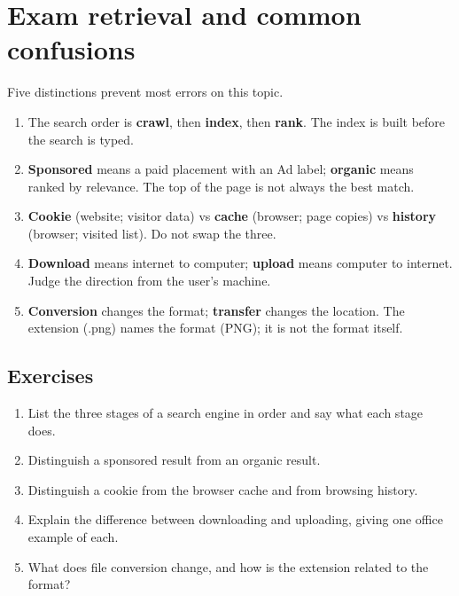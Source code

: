 \section{Exam retrieval and common confusions}
Five distinctions prevent most errors on this topic.
\begin{enumerate}
  \item The search order is \textbf{crawl}, then \textbf{index}, then
    \textbf{rank}. The index is built before the search is typed.
  \item \textbf{Sponsored} means a paid placement with an Ad label;
    \textbf{organic} means ranked by relevance. The top of the page is not
    always the best match.
  \item \textbf{Cookie} (website; visitor data) vs \textbf{cache} (browser;
    page copies) vs \textbf{history} (browser; visited list). Do not swap
    the three.
  \item \textbf{Download} means internet to computer; \textbf{upload} means
    computer to internet. Judge the direction from the user's machine.
  \item \textbf{Conversion} changes the format; \textbf{transfer} changes
    the location. The extension (.png) names the format (PNG); it is not
    the format itself.
\end{enumerate}

\subsection*{Exercises}
\begin{enumerate}[label=\arabic*.]
  \item List the three stages of a search engine in order and say what each stage does.
  \item Distinguish a sponsored result from an organic result.
  \item Distinguish a cookie from the browser cache and from browsing history.
  \item Explain the difference between downloading and uploading, giving one office example of each.
  \item What does file conversion change, and how is the extension related to the format?
\end{enumerate}


